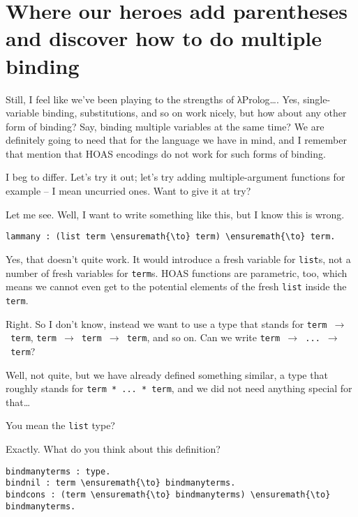 \section{Where our heroes add parentheses and discover how to do
multiple
binding}\label{where-our-heroes-add-parentheses-and-discover-how-to-do-multiple-binding}

\heroSTUDENT{} Still, I feel like we've been playing to the strengths of
\foreignlanguage{greek}{λ}Prolog\ldots{}. Yes, single-variable binding, substitutions, and so on
work nicely, but how about any other form of binding? Say, binding
multiple variables at the same time? We are definitely going to need
that for the language we have in mind, and I remember that
\citet{keuchel2016needle} mention that HOAS encodings do not work for
such forms of binding.

\heroADVISOR{} I beg to differ. Let's try it out; let's try adding
multiple-argument functions for example -- I mean uncurried ones. Want
to give it at try?

\heroSTUDENT{} Let me see. Well, I want to write something like this, but I
know this is wrong.

\begin{verbatim}
lammany : (list term \ensuremath{\to} term) \ensuremath{\to} term.
\end{verbatim}

\heroADVISOR{} Yes, that doesn't quite work. It would introduce a fresh
variable for \texttt{list}s, not a number of fresh variables for
\texttt{term}s. HOAS functions are parametric, too, which means we
cannot even get to the potential elements of the fresh \texttt{list}
inside the \texttt{term}.

\heroSTUDENT{} Right. So I don't know, instead we want to use a type that
stands for \texttt{term\ \ensuremath{\to}\ term},
\texttt{term\ \ensuremath{\to}\ term\ \ensuremath{\to}\ term}, and so on.
Can we write \texttt{term\ \ensuremath{\to}\ ...\ \ensuremath{\to}\ term}?

\heroADVISOR{} Well, not quite, but we have already defined something similar,
a type that roughly stands for \texttt{term\ *\ ...\ *\ term}, and we
did not need anything special for that\ldots{}

\heroSTUDENT{} You mean the \texttt{list} type?

\heroADVISOR{} Exactly. What do you think about this definition?

\begin{verbatim}
bindmanyterms : type.
bindnil : term \ensuremath{\to} bindmanyterms.
bindcons : (term \ensuremath{\to} bindmanyterms) \ensuremath{\to} bindmanyterms.
\end{verbatim}


